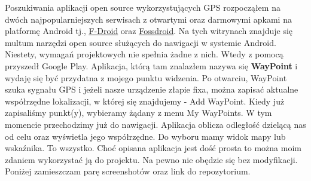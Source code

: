 

Poszukiwania aplikacji open source wykorzystujących GPS rozpocząłem na dwóch najpopularniejszych serwisach z otwartymi oraz darmowymi apkami na platformę Android tj., {\color{blue}\underline{\href{https://f-droid.org/repository/browse/?fdcategory=Navigation}{F-Droid}}} oraz {\color{blue}\underline{\href{https://fossdroid.com/c/navigation/whats_new.html}{Fossdroid}}}. Na tych witrynach znajduje się multum narzędzi open source służących do nawigacji w systemie Android. Niestety, wymagań projektowych nie spełnia żadne z nich. Wtedy z pomocą przyszedł Google Play. Aplikacja, którą tam znalazłem nazywa się \textbf{WayPoint} i wydaję się być przydatna z mojego punktu widzenia. Po otwarciu, WayPoint szuka sygnału GPS i jeżeli nasze urządzenie złapie fixa, można zapisać aktualne współrzędne lokalizacji, w której się znajdujemy - Add WayPoint. Kiedy już zapisaliśmy punkt(y), wybieramy żądany z menu My WayPoints. W tym momencie przechodzimy już do nawigacji. Aplikacja oblicza odległość dzielącą nas od celu oraz wyświetla jego współrzędne. Do wyboru mamy widok mapy lub wskaźnika. To wszystko. Choć opisana aplikacja jest dość prosta to można moim zdaniem wykorzystać ją do projektu. Na pewno nie obędzie się bez modyfikacji. Poniżej zamieszczam parę screenshotów oraz link do repozytorium.

